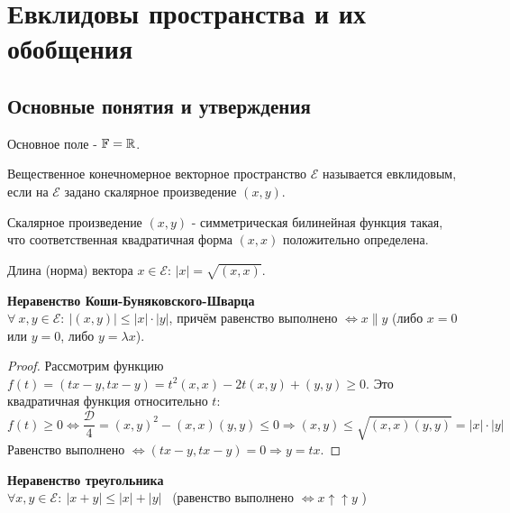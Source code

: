 \section{Евклидовы пространства и их обобщения}
\subsection{Основные понятия и утверждения}
Основное поле - $\mathbb{F} = \mathbb{R}$.
\begin{definition}
    Вещественное конечномерное векторное пространство $\mathcal{E}$ называется евклидовым, если на $\mathcal{E}$ задано скалярное произведение $(x,y)$.
\end{definition}
\begin{definition}
    Скалярное произведение $(x,y)$ - симметрическая билинейная функция такая, что соответственная квадратичная форма $(x,x)$ положительно определена.
\end{definition} 
\begin{definition}
    Длина (норма) вектора $x\in\mathcal{E}$: $|x| = \sqrt{(x,x)}$.
\end{definition}
\begin{theorem} \textbf{Неравенство Коши-Буняковского-Шварца}\\
    $\forall \ x,y\in\mathcal{E}: \ |(x,y)|\leqslant|x|\cdot|y|$, причём равенство выполнено $\Longleftrightarrow  x \parallel y$ (либо $x = 0$ или $y = 0$, либо $y = \lambda x$).
\end{theorem}
\begin{proof}
    Рассмотрим функцию $f(t) = (tx-y, tx-y) = t^2(x,x) -2t(x,y) + (y,y) \geqslant 0$. Это квадратичная функция относительно $t$:
    $$f(t)\geqslant 0 \Longleftrightarrow  \frac{\mathcal{D}}{4} = (x,y)^2 - (x,x)(y,y) \leqslant 0 \Rightarrow (x,y) \leq \sqrt{(x,x)(y,y)} = |x|\cdot|y|$$
    Равенство выполнено $\Longleftrightarrow  (tx-y, tx-y) = 0 \Rightarrow y = tx$.
\end{proof}
\begin{theorem} \textbf{Неравенство треугольника}\\
    $\forall x, y \in \mathcal{E} : \ |x+y| \leq |x| + |y|$ \ (равенство выполнено $\Longleftrightarrow x \uparrow \uparrow y$ ) 
\end{theorem}

